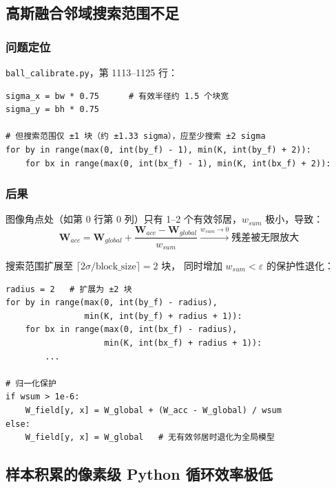 \documentclass[12pt, a4paper]{ctexart}
\begin{document}
\subsection{高斯融合邻域搜索范围不足}
\label{subsec:gaussian_blend}

\subsubsection*{问题定位}

\texttt{ball\_calibrate.py}，第 1113--1125 行：

\begin{lstlisting}[caption={sigma 与搜索范围不匹配}]
sigma_x = bw * 0.75      # 有效半径约 1.5 个块宽
sigma_y = bh * 0.75

# 但搜索范围仅 ±1 块（约 ±1.33 sigma），应至少搜索 ±2 sigma
for by in range(max(0, int(by_f) - 1), min(K, int(by_f) + 2)):
    for bx in range(max(0, int(bx_f) - 1), min(K, int(bx_f) + 2)):
\end{lstlisting}

\subsubsection*{后果}

图像角点处（如第 $0$ 行第 $0$ 列）只有 1--2 个有效邻居，$w_{sum}$ 极小，导致：
\[
  \mathbf{W}_{acc}
  = \mathbf{W}_{global} + \frac{\mathbf{W}_{acc} - \mathbf{W}_{global}}{w_{sum}}
  \xrightarrow{w_{sum} \to 0} \text{残差被无限放大}
\]

\begin{fixbox}
搜索范围扩展至 $\lceil 2\sigma / \text{block\_size} \rceil = 2$ 块，
同时增加 $w_{sum} < \varepsilon$ 的保护性退化：

\begin{lstlisting}
radius = 2   # 扩展为 ±2 块
for by in range(max(0, int(by_f) - radius),
                min(K, int(by_f) + radius + 1)):
    for bx in range(max(0, int(bx_f) - radius),
                    min(K, int(bx_f) + radius + 1)):
        ...

# 归一化保护
if wsum > 1e-6:
    W_field[y, x] = W_global + (W_acc - W_global) / wsum
else:
    W_field[y, x] = W_global   # 无有效邻居时退化为全局模型
\end{lstlisting}
\end{fixbox}

\subsection{样本积累的像素级 Python 循环效率极低}
\label{subsec:loop}
\end{document}
